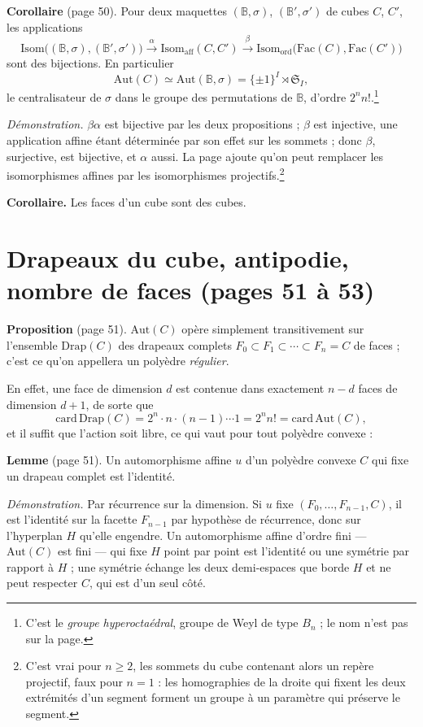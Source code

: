 \documentclass[11pt,a4paper]{article}
\begin{document}
\textbf{Corollaire} (page 50). Pour deux maquettes $(\mathbb{B}, \sigma)$,
$(\mathbb{B}', \sigma')$ de cubes $C$, $C'$, les applications
\[
  \mathrm{Isom}\bigl((\mathbb{B}, \sigma), (\mathbb{B}', \sigma')\bigr)
  \xrightarrow{\ \alpha\ } \mathrm{Isom}_{\mathrm{aff}}(C, C')
  \xrightarrow{\ \beta\ } \mathrm{Isom}_{\mathrm{ord}}\bigl(\mathrm{Fac}(C),
  \mathrm{Fac}(C')\bigr)
\]
sont des bijections. En particulier
\[
  \mathrm{Aut}(C) \simeq \mathrm{Aut}(\mathbb{B}, \sigma) = \{\pm 1\}^I
  \rtimes \mathfrak{S}_I ,
\]
le centralisateur de $\sigma$ dans le groupe des permutations de
$\mathbb{B}$, d'ordre $2^n n!$.\footnote{C'est le \emph{groupe hyperoctaédral},
groupe de Weyl de type $B_n$ ; le nom n'est pas sur la page.}

\emph{Démonstration.} $\beta\alpha$ est bijective par les deux propositions ;
$\beta$ est injective, une application affine étant déterminée par son effet
sur les sommets ; donc $\beta$, surjective, est bijective, et $\alpha$ aussi.
La page ajoute qu'on peut remplacer les isomorphismes affines par les
isomorphismes projectifs.\footnote{C'est vrai pour $n \geqslant 2$, les
sommets du cube contenant alors un repère projectif, faux pour $n = 1$ : les
homographies de la droite qui fixent les deux extrémités d'un segment forment
un groupe à un paramètre qui préserve le segment.}

\textbf{Corollaire.} Les faces d'un cube sont des cubes.

\section*{Drapeaux du cube, antipodie, nombre de faces (pages 51 à 53)}

\textbf{Proposition} (page 51). $\mathrm{Aut}(C)$ opère simplement
transitivement sur l'ensemble $\mathrm{Drap}(C)$ des drapeaux complets $F_0
\subset F_1 \subset \cdots \subset F_n = C$ de faces ; c'est ce qu'on
appellera un polyèdre \emph{régulier}.

En effet, une face de dimension $d$ est contenue dans exactement $n - d$
faces de dimension $d+1$, de sorte que
\[
  \mathrm{card}\, \mathrm{Drap}(C) = 2^n \cdot n \cdot (n-1) \cdots 1 = 2^n
  n! = \mathrm{card}\, \mathrm{Aut}(C) ,
\]
et il suffit que l'action soit libre, ce qui vaut pour tout polyèdre convexe :

\textbf{Lemme} (page 51). Un automorphisme affine $u$ d'un polyèdre convexe
$C$ qui fixe un drapeau complet est l'identité.

\emph{Démonstration.} Par récurrence sur la dimension. Si $u$ fixe $(F_0,
\ldots, F_{n-1}, C)$, il est l'identité sur la facette $F_{n-1}$ par
hypothèse de récurrence, donc sur l'hyperplan $H$ qu'elle engendre. Un
automorphisme affine d'ordre fini --- $\mathrm{Aut}(C)$ est fini --- qui fixe
$H$ point par point est l'identité ou une symétrie par rapport à $H$ ; une
symétrie échange les deux demi-espaces que borde $H$ et ne peut respecter
$C$, qui est d'un seul côté.
\end{document}
